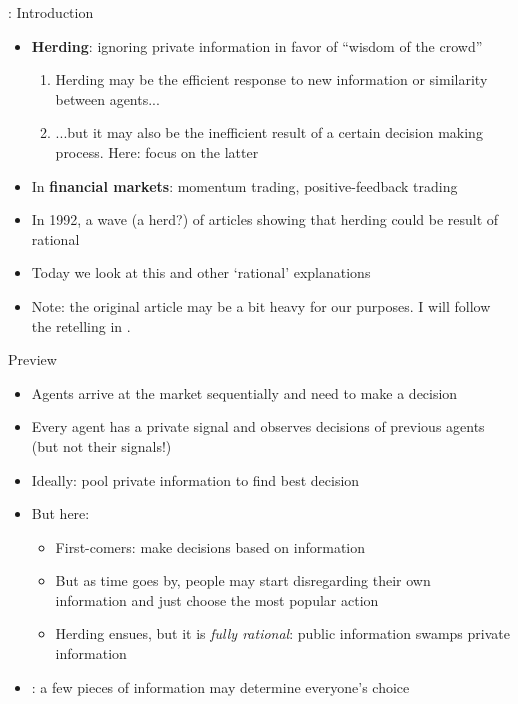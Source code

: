 \documentclass[english,10pt
,aspectratio=169
]{beamer}
\begin{document}
\begin{frame}{\cite{smith_pathological_2000}: Introduction}
	\begin{itemize}
		\item \textbf{Herding}: ignoring private information in favor of ``wisdom of the crowd''
		\begin{enumerate}
			\item Herding may be the efficient response to new information or similarity between agents...
			\item ...but it may also be the inefficient result of a certain decision making process. Here: focus on the latter
		\end{enumerate}
		\item In \textbf{financial markets}: momentum trading, positive-feedback trading
		\item In 1992, a wave (a herd?) of articles showing that  herding could be result of rational 
		\item Today we look at this and other `rational' explanations
		\item Note: the original article may be a bit heavy for our purposes. I will follow the retelling in \cite{smith_observational_2011}.
	\end{itemize}
\end{frame}


\begin{frame}{Preview}
	\begin{itemize}
		\item Agents arrive at the market sequentially and need to make a decision
		\item Every agent has a private signal and observes decisions of previous agents (but not their signals!)
		\item Ideally: pool private information to find best decision
		\item But here: 
		\begin{itemize}
			\item First-comers: make decisions based on information
			\item But as time goes by, people may start disregarding their own
			\\ information and just choose the most popular action
			\item Herding ensues, but it is \emph{fully rational}: public information swamps private information
		\end{itemize}
		\item {}: a few pieces of information may determine everyone's choice
	\end{itemize}
\end{frame}
\end{document}
